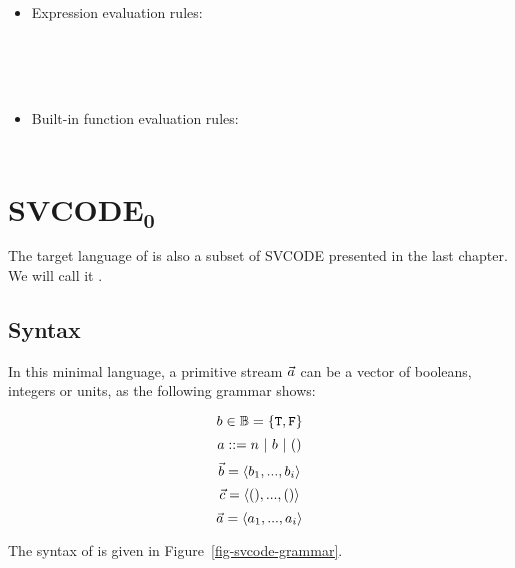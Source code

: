 \begin{itemize}
\item Expression evaluation rules:
	
	\\[2ex]
	
	\\[2ex]
	
	\\[2ex]
	
\item Built-in function evaluation rules:

	
	 \\[2ex]
	
	
\end{itemize}


\section{$\mathbf{SVCODE_0}$}
The target language of \fmsnesl is also a subset of SVCODE presented in the last chapter. 
We will call it  \fmsvcode.

\subsection{Syntax}
In this minimal language, a primitive stream $\vec a$ can be a vector of booleans, integers or units, as the following grammar shows:

$$b \in \mathbb{B} = \{\mathtt{T},\mathtt{F} \}$$
$$ a ::= n \ | \ b \ | \ ()$$
$$\vec b = \langle b_1,...,b_i \rangle$$ 
$$\vec c = \langle (),...,() \rangle $$
$$\vec a = \langle a_1,...,a_i \rangle  $$ 

\hspace{1cm}

The syntax of \fmsvcode is given in Figure~\ref{fig-svcode-grammar}.


